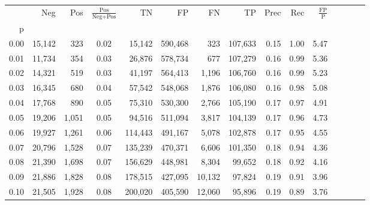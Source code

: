 \begin{tabular}{rrrcrrrrrrrrrrr}
\toprule
{} &     Neg &    Pos & $\frac{\text{Pos}}{\text{Neg}+\text{Pos}}$ &       TN &       FP &       FN &       TP &  Prec &   Rec & $\frac{\text{FP}}{\text{P}}$ \\
p    &         &        &                                            &          &          &          &          &       &       &                              \\
\midrule
0.00 &  15,142 &    323 &                                       0.02 &   15,142 &  590,468 &      323 &  107,633 &  0.15 &  1.00 &                         5.47 \\
0.01 &  11,734 &    354 &                                       0.03 &   26,876 &  578,734 &      677 &  107,279 &  0.16 &  0.99 &                         5.36 \\
0.02 &  14,321 &    519 &                                       0.03 &   41,197 &  564,413 &    1,196 &  106,760 &  0.16 &  0.99 &                         5.23 \\
0.03 &  16,345 &    680 &                                       0.04 &   57,542 &  548,068 &    1,876 &  106,080 &  0.16 &  0.98 &                         5.08 \\
0.04 &  17,768 &    890 &                                       0.05 &   75,310 &  530,300 &    2,766 &  105,190 &  0.17 &  0.97 &                         4.91 \\
0.05 &  19,206 &  1,051 &                                       0.05 &   94,516 &  511,094 &    3,817 &  104,139 &  0.17 &  0.96 &                         4.73 \\
0.06 &  19,927 &  1,261 &                                       0.06 &  114,443 &  491,167 &    5,078 &  102,878 &  0.17 &  0.95 &                         4.55 \\
0.07 &  20,796 &  1,528 &                                       0.07 &  135,239 &  470,371 &    6,606 &  101,350 &  0.18 &  0.94 &                         4.36 \\
0.08 &  21,390 &  1,698 &                                       0.07 &  156,629 &  448,981 &    8,304 &   99,652 &  0.18 &  0.92 &                         4.16 \\
0.09 &  21,886 &  1,828 &                                       0.08 &  178,515 &  427,095 &   10,132 &   97,824 &  0.19 &  0.91 &                         3.96 \\
0.10 &  21,505 &  1,928 &                                       0.08 &  200,020 &  405,590 &   12,060 &   95,896 &  0.19 &  0.89 &                         3.76 \\

\end{tabular}
